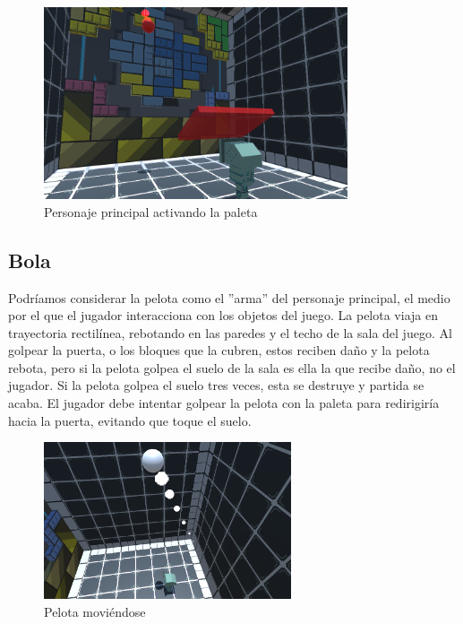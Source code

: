 \begin{figure}[h]
	\includegraphics[width=0.8\textwidth]{images/estructura/fisica/flick_paddle}
	\centering
	\caption{Personaje principal activando la paleta}
\end{figure}

\subsection{Bola}
Podríamos considerar la pelota como el ''arma'' del personaje principal, el medio por el que el jugador interacciona con los objetos del juego. La pelota viaja en trayectoria rectilínea, rebotando en las paredes y el techo de la sala del juego. Al golpear la puerta, o los bloques que la cubren, estos reciben daño y la pelota rebota, pero si la pelota golpea el suelo de la sala es ella la que recibe daño, no el jugador. Si la pelota golpea el suelo tres veces, esta se destruye y partida se acaba. El jugador debe intentar golpear la pelota con la paleta para redirigiría hacia la puerta, evitando que toque el suelo.

\begin{figure}[h]
	\includegraphics[width=0.65\textwidth]{images/estructura/fisica/ball_moving}
	\centering
	\caption{Pelota moviéndose}
\end{figure}

